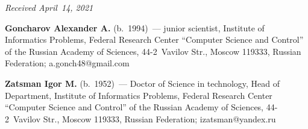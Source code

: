 \vspace*{-3pt}

  \hfill{\small\textit{Received April~14, 2021}}




\Contr

\noindent
\textbf{Goncharov Alexander A.} (b.\ 1994)~---
junior scientist, Institute of Informatics Problems, Federal Research Center 
``Computer Science and Control'' of the Russian Academy of Sciences,  
44-2~Vavilov Str., Moscow 119333, Russian Federation; 
\mbox{a.gonch48@gmail.com}

\vspace*{3pt}

\noindent
\textbf{Zatsman Igor M.} (b.\ 1952)~--- Doctor of Science in technology, Head of 
Department, Institute of Informatics Problems, Federal Research Center 
``Computer Science and Control'' of the Russian Academy of Sciences,  
44-2~Vavilov Str., Moscow 119333, Russian Federation; 
\mbox{izatsman@yandex.ru}

\label{end\stat}

\renewcommand{\bibname}{\protect\rm Литература}